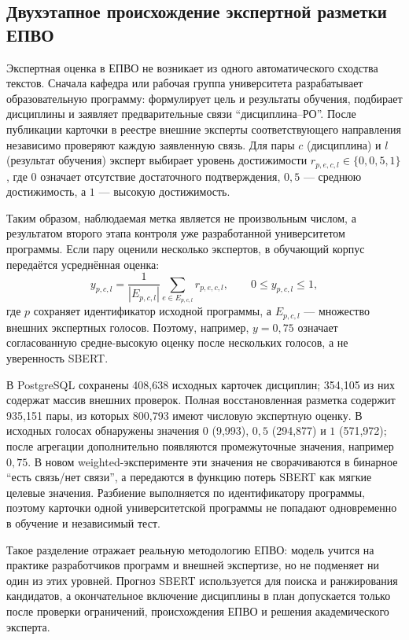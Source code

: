 \documentclass[twoside,11pt]{article}
\begin{document}
\subsection{Двухэтапное происхождение экспертной разметки ЕПВО}

Экспертная оценка в ЕПВО не возникает из одного автоматического сходства текстов. Сначала кафедра или рабочая группа университета разрабатывает образовательную программу: формулирует цель и результаты обучения, подбирает дисциплины и заявляет предварительные связи ``дисциплина--РО''. После публикации карточки в реестре внешние эксперты соответствующего направления независимо проверяют каждую заявленную связь. Для пары $c$ (дисциплина) и $l$ (результат обучения) эксперт выбирает уровень достижимости $r_{p,e,c,l}\in\{0,0{,}5,1\}$, где $0$ означает отсутствие достаточного подтверждения, $0{,}5$ --- среднюю достижимость, а $1$ --- высокую достижимость.

Таким образом, наблюдаемая метка является не произвольным числом, а результатом второго этапа контроля уже разработанной университетом программы. Если пару оценили несколько экспертов, в обучающий корпус передаётся усреднённая оценка:
\begin{equation}
  y_{p,c,l}=\frac{1}{|E_{p,c,l}|}\sum_{e\in E_{p,c,l}}r_{p,e,c,l},
  \qquad 0\leq y_{p,c,l}\leq 1,
  \label{eq:epvo-expert-aggregation}
\end{equation}
где $p$ сохраняет идентификатор исходной программы, а $E_{p,c,l}$ --- множество внешних экспертных голосов. Поэтому, например, $y=0{,}75$ означает согласованную средне-высокую оценку после нескольких голосов, а не уверенность SBERT.

В PostgreSQL сохранены 408,638 исходных карточек дисциплин; 354,105 из них содержат массив внешних проверок. Полная восстановленная разметка содержит 935,151 пары, из которых 800,793 имеют числовую экспертную оценку. В исходных голосах обнаружены значения $0$ (9,993), $0{,}5$ (294,877) и $1$ (571,972); после агрегации дополнительно появляются промежуточные значения, например $0{,}75$. В новом weighted-эксперименте эти значения не сворачиваются в бинарное ``есть связь/нет связи'', а передаются в функцию потерь SBERT как мягкие целевые значения. Разбиение выполняется по идентификатору программы, поэтому карточки одной университетской программы не попадают одновременно в обучение и независимый тест.

Такое разделение отражает реальную методологию ЕПВО: модель учится на практике разработчиков программ и внешней экспертизе, но не подменяет ни один из этих уровней. Прогноз SBERT используется для поиска и ранжирования кандидатов, а окончательное включение дисциплины в план допускается только после проверки ограничений, происхождения ЕПВО и решения академического эксперта.
\end{document}
